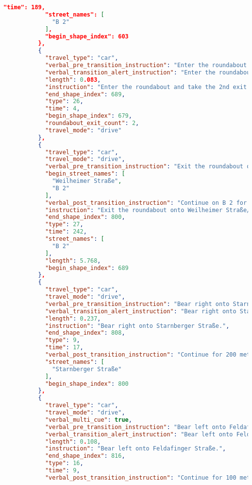 \begin{lstlisting}[language=json,breaklines=true]
            "time": 189,
            "street_names": [
              "B 2"
            ],
            "begin_shape_index": 603
          },
          {
            "travel_type": "car",
            "verbal_pre_transition_instruction": "Enter the roundabout and take the 2nd exit.",
            "verbal_transition_alert_instruction": "Enter the roundabout and take the 2nd exit.",
            "length": 0.083,
            "instruction": "Enter the roundabout and take the 2nd exit.",
            "end_shape_index": 689,
            "type": 26,
            "time": 4,
            "begin_shape_index": 679,
            "roundabout_exit_count": 2,
            "travel_mode": "drive"
          },
          {
            "travel_type": "car",
            "travel_mode": "drive",
            "verbal_pre_transition_instruction": "Exit the roundabout onto Weilheimer Straße, B 2.",
            "begin_street_names": [
              "Weilheimer Straße",
              "B 2"
            ],
            "verbal_post_transition_instruction": "Continue on B 2 for 5.8 kilometers.",
            "instruction": "Exit the roundabout onto Weilheimer Straße/B 2. Continue on B 2.",
            "end_shape_index": 800,
            "type": 27,
            "time": 242,
            "street_names": [
              "B 2"
            ],
            "length": 5.768,
            "begin_shape_index": 689
          },
          {
            "travel_type": "car",
            "travel_mode": "drive",
            "verbal_pre_transition_instruction": "Bear right onto Starnberger Straße.",
            "verbal_transition_alert_instruction": "Bear right onto Starnberger Straße.",
            "length": 0.237,
            "instruction": "Bear right onto Starnberger Straße.",
            "end_shape_index": 808,
            "type": 9,
            "time": 17,
            "verbal_post_transition_instruction": "Continue for 200 meters.",
            "street_names": [
              "Starnberger Straße"
            ],
            "begin_shape_index": 800
          },
          {
            "travel_type": "car",
            "travel_mode": "drive",
            "verbal_multi_cue": true,
            "verbal_pre_transition_instruction": "Bear left onto Feldafinger Straße. Then Bear left to stay on Feldafinger Straße.",
            "verbal_transition_alert_instruction": "Bear left onto Feldafinger Straße.",
            "length": 0.108,
            "instruction": "Bear left onto Feldafinger Straße.",
            "end_shape_index": 816,
            "type": 16,
            "time": 9,
            "verbal_post_transition_instruction": "Continue for 100 meters.",

\end{lstlisting}
